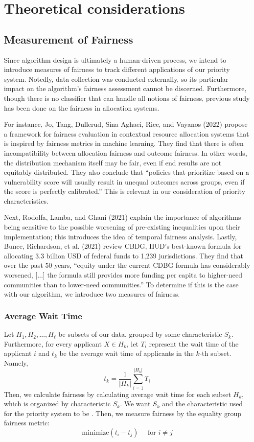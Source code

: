\documentclass[11pt]{article}
\begin{document}
\section{Theoretical considerations}

\subsection{Measurement of Fairness}

Since algorithm design is ultimately a human-driven process, we intend to introduce measures
of fairness to track different applications of our priority system. Notedly, data collection was conducted externally, so its particular impact on the algorithm’s fairness assessment cannot be discerned. Furthermore, though there is no classifier that can handle all notions of fairness, previous study has been done on the fairness in allocation systems.

For instance, Jo, Tang, Dullerud, Sina Aghaei, Rice, and Vayanos (2022) \cite{formulaeval3} propose a framework
for fairness evaluation in contextual resource allocation systems that is inspired by fairness
metrics in machine learning. They find that there is often incompatibility between allocation
fairness and outcome fairness. In other words, the distribution mechanism itself may be fair,
even if end results are not equitably distributed. They also conclude that “policies that prioritize based on a vulnerability score will usually result in unequal outcomes across groups, even if the score is perfectly calibrated.” This is relevant in our consideration of priority characteristics.

Next, Rodolfa, Lamba, and Ghani (2021) \cite{formulaeval2} explain the importance of algorithms being sensitive to
the possible worsening of pre-existing inequalities upon their implementation; this introduces the idea of temporal fairness analysis. Lastly, Bunce, Richardson, et al. (2021) \cite{formulaeval} review CBDG,
HUD's best-known formula for allocating 3.3 billion USD of federal funds to 1,239 jurisdictions. They find that over the past 50 years, “equity under the current CDBG formula has considerably worsened, [...] the formula still provides more funding per capita to higher-need communities than to lower-need communities.” To determine if this is the case with our algorithm, we introduce two measures of fairness.

\subsubsection{Average Wait Time}
Let $H_1, H_2, \dots, H_\ell$ be subsets of our data, grouped by some characteristic $S_k$. Furthermore, for every applicant $X \in H_k$, let $T_i$ represent the wait time of the applicant $i$ and $t_k$ be the average wait time of applicants in the $k$-th subset. Namely,
\[t_k = \frac{1}{|H_k|}\sum_{i=1}^{|H_k|}T_i\]
Then, we calculate fairness by calculating average wait time for each subset $H_k$, which is organized by characteristic $S_k$. We want $S_k$ and the characteristic used for the priority system to be . Then, we measure fairness by the equality group fairness metric:
\[\text{minimize}(t_i - t_j) \quad \text{ for } i \neq j\]
\end{document}
